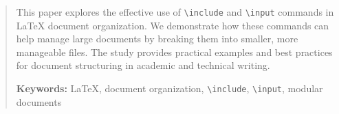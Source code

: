 \begin{abstract}
This paper explores the effective use of \texttt{\textbackslash include} and \texttt{\textbackslash input} 
commands in LaTeX document organization. We demonstrate how these commands can help manage 
large documents by breaking them into smaller, more manageable files. The study provides 
practical examples and best practices for document structuring in academic and technical writing.

\textbf{Keywords:} LaTeX, document organization, \texttt{\textbackslash include}, \texttt{\textbackslash input}, 
modular documents
\end{abstract}
